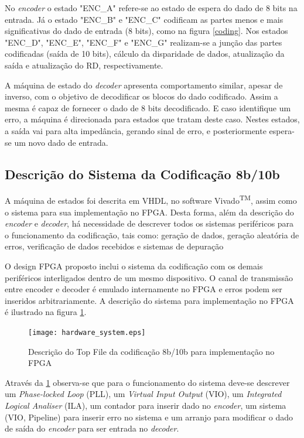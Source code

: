 \documentclass[11pt,twocolumn]{article}
\begin{document}
No \textit{encoder} o estado "ENC\_A" refere-se ao estado de espera do dado de 8 bits na entrada. Já o estado "ENC\_B" e "ENC\_C" codificam as partes menos e mais significativas do dado de entrada (8 bits), como na figura \ref{coding}. Nos estados "ENC\_D", "ENC\_E", "ENC\_F" e "ENC\_G" realizam-se a junção das partes codificadas (saída de 10 bits), cálculo da disparidade de dados, atualização da saída e atualização do RD, respectivamente. 

A máquina de estado do \textit{decoder} apresenta comportamento similar, apesar de inverso, com o objetivo de decodificar os blocos do dado codificado. Assim a mesma é capaz de fornecer o dado de 8 bits decodificado. E caso identifique um erro, a máquina é direcionada para estados que tratam deste caso. Nestes estados, a saída vai para alta impedância, gerando sinal de erro, e posteriormente espera-se um novo dado de entrada. 

\subsection{Descrição do Sistema da Codificação 8b/10b}
A máquina de estados foi descrita em VHDL, no software Vivado\textsuperscript{TM}, assim como o sistema para sua implementação no FPGA. Desta forma, além da descrição do \textit{encoder} e \textit{decoder}, há necessidade de descrever todos os sistemas periféricos para o funcionamento da codificação, tais como: geração de dados, geração aleatória de erros, verificação de dados recebidos e sistemas de depuração 

O design FPGA proposto inclui o sistema da codificação com os demais periféricos interligados dentro de um mesmo dispositivo. O canal de transmissão entre encoder e decoder é emulado internamente no FPGA e erros podem ser inseridos arbitrariamente. A descrição do sistema para implementação no FPGA é ilustrado na figura \ref{implementation}.

\begin{figure}[htb]
	\centering
	\texttt{[image: hardware\_system.eps]}
	\caption{Descrição do Top File da codificação 8b/10b para implementação no FPGA}
	\label{implementation}
\end{figure}

Através da \ref{implementation} observa-se que para o funcionamento do sistema deve-se descrever um \textit{Phase-locked Loop} (PLL), um \textit{Virtual Input Output} (VIO), um \textit{Integrated Logical Analiser} (ILA), um contador para inserir dado no \textit{encoder}, um sistema (VIO, Pipeline) para inserir erro no sistema e um arranjo para modificar o dado de saída do \textit{encoder} para ser entrada no \textit{decoder}.
\end{document}
